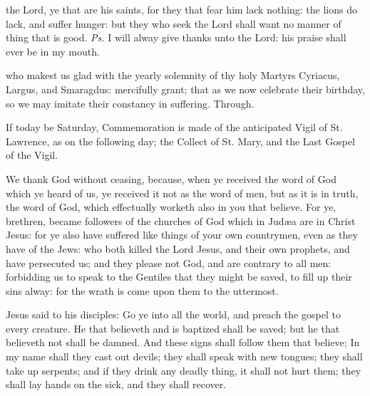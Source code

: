 \introit
{} the Lord, ye that are his saints, for they that fear him lack nothing: the lions do lack, and suffer hunger: but they who seek the Lord shall want no manner of thing that is good. \textit{Ps.} I will alway give thanks unto the Lord: his praise shall ever be in my mouth.

 who makest us glad with the yearly solemnity of thy holy Martyrs Cyriacus, Largus, and Smaragdus: mercifully grant; that as we now celebrate their birthday, so we may imitate their constancy in suffering. Through.

\begin{rubric}
	If today be Saturday, Commemoration is made of the anticipated Vigil of St. Lawrence, as on the following day; the  Collect of St. Mary, and the Last Gospel of the Vigil.
\end{rubric}

 We thank God without ceasing, because, when ye received the word of God which ye heard of us, ye received it not as the word of men, but as it is in truth, the word of God, which effectually worketh also in you that believe. For ye, brethren, became followers of the churches of God which in Jud{\ae}a are in Christ Jesus: for ye also have suffered like things of your own countrymen, even as they have of the Jews: who both killed the Lord Jesus, and their own prophets, and have persecuted us; and they please not God, and are contrary to all men: forbidding us to speak to the Gentiles that they might be saved, to fill up their sins alway: for the wrath is come upon them to the uttermost.


 Jesus said to his disciples: Go ye into all the world, and preach the gospel to every creature. He that believeth and is baptized shall be saved; but he that believeth not shall be damned. And these signs shall follow them that believe; In my name shall they cast out devils; they shall speak with new tongues; they shall take up serpents; and if they drink any deadly thing, it shall not hurt them; they shall lay hands on the sick, and they shall recover.

